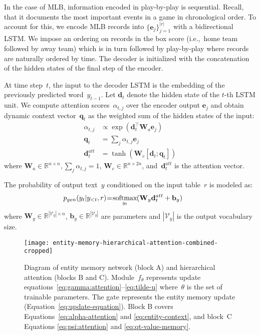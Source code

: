 \documentclass[11pt,a4paper]{article}
\DeclareMathOperator\softmax{\operatorname{softmax}}
\begin{document}
In the case of MLB, information encoded in play-by-play is
sequential. Recall, that it documents the most important events in a
game in chronological order.  To account for this, we encode MLB
records into $\{ \mathbf{e}_j \}_{j=1}^{|r|}$ with a bidirectional
LSTM. We impose an ordering on records in the box score (i.e.,~home
team followed by away team) which is in turn followed by play-by-play
where records are naturally ordered by time.  The decoder is
initialized with the concatenation of the hidden states of the final
step of the encoder.

At time step~$t$, the input to the decoder LSTM is the embedding of
the previously predicted word~$y_{t-1}$.  Let $\mathbf{d}_t$ denote
the hidden state of the $t$-th LSTM unit.  We compute attention
scores~$\alpha_{t,j}$ over the encoder output $\mathbf{e}_j$ and
obtain dynamic context vector~$\mathbf{q}_t$ as the weighted sum of
the hidden states of the input:
\begin{align}
\alpha_{t,j} &\propto \exp (\mathbf{d}_t^\intercal \mathbf{W}_a \mathbf{e}_j) \nonumber\\
\mathbf{q}_t &= \sum_j \alpha_{t,j} \mathbf{e}_j \nonumber\\
\mathbf{d}_t^{att} &= \tanh( \mathbf{W}_c [ \mathbf{d}_t ;
                     \mathbf{q}_t ] ) \label{eq:dt-att}
\end{align}
where $\mathbf{W}_a \in \mathbb{R}^{n \times n}, 
\sum_{j} \alpha_{t,j} = 1$, $\mathbf{W}_c \in \mathbb{R}^{n \times
  2n}$, and~$\mathbf{d}_t^{att}$ is the attention vector. 




The probability of output text~$y$ conditioned on the input table~$r$
is modeled as:
\begin{align}
\hspace*{-.7cm}p_{gen} (y_t | y_{<t},r) &\hspace*{-.5ex}=\hspace*{-.5ex}\softmax_{y_t}{\hspace*{-.5ex}( \mathbf{W}_y \mathbf{d}_t^{att} + \mathbf{b}_y )}\hspace*{-2ex} \label{eq:p-gen}
\end{align}
where
$\mathbf{W}_y \in \mathbb{R}^{|\mathcal{V}_y| \times n}$,
$\mathbf{b}_y \in \mathbb{R}^{|\mathcal{V}_y|}$ are parameters and
$|\mathcal{V}_y|$ is the output vocabulary size.

\begin{figure*}[t]
\centering
\texttt{[image: entity-memory-hierarchical-attention-combined-cropped]}
\caption{Diagram of entity memory network (block A) and hierarchical
  attention (blocks B and C). Module~$f_\theta$
represents update
equations~\eqref{eq:gamma:attention}--\eqref{eq:tilde-u}
where~$\theta$ is the set of trainable parameters. The gate represents 
the entity memory update (Equation~\eqref{eq:update-equation}). 
 Block B covers Equations~\eqref{eq:alpha-attention}
and \eqref{eq:entity-context}, and block~C Equations
\eqref{eq:psi:attention} and \eqref{eq:qt-value-memory}.
\label{fig:entity-memory-updates}}
\end{figure*}
\end{document}
